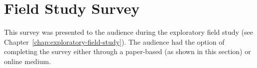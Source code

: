 
\appendix

\let\cleardoublepage\clearpage %
\chapter{Field Study Survey}
\label{appendix:field-study-survey}

This survey was presented to the audience during the exploratory field study (see Chapter~\ref{chap:exploratory-field-study}). The audience had the option of completing the survey either through a paper-based (as shown in this section) or online medium. 

\clearpage

\begin{center}
\end{center}


